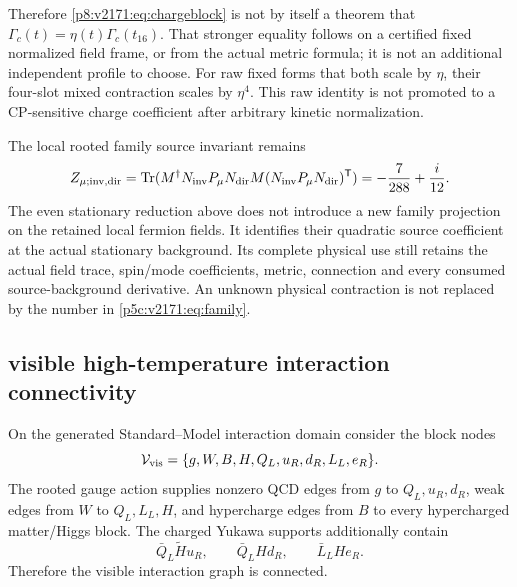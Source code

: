 \documentclass[12pt,a4paper]{article}
\begin{document}
Therefore \eqref{p8:v2171:eq:chargeblock} is not by itself a theorem that
$\Gamma_c(t)=\eta(t)\Gamma_c(t_{16})$. That stronger equality follows on
a certified fixed normalized field frame, or from the actual metric formula;
it is not an additional independent profile to choose. For raw fixed forms
that both scale by $\eta$, their four-slot mixed contraction scales by
$\eta^4$. This raw identity is not promoted to a CP-sensitive charge
coefficient after arbitrary kinetic normalization.

The local rooted family source invariant remains
\begin{equation}
 Z_{\mu;\mathrm{inv,dir}}
 =\operatorname{Tr}(M^\dagger N_{\rm inv}P_\mu N_{\rm dir}
       M(N_{\rm inv}P_\mu N_{\rm dir})^{\mathsf T})
 =-\frac7{288}+\frac{i}{12}.
 \label{p5c:v2171:eq:family}
\end{equation}
The even stationary reduction above does not introduce a new family projection
on the retained local fermion fields. It identifies their quadratic source
coefficient at the actual stationary background. Its complete physical use
still retains the actual field trace, spin/mode coefficients, metric,
connection and every consumed source-background derivative. An unknown
physical contraction is not replaced by the number in \eqref{p5c:v2171:eq:family}.

\subsection{visible high-temperature interaction connectivity}
\label{p5c:sec:v269-k16-visible-connectivity}

\begin{theorem}
\label{p5c:thm:v269-visible-interaction-graph}
On the generated Standard--Model interaction domain consider the block nodes
\[
 \mathcal V_{\rm vis}
 =\{g,W,B,H,Q_L,u_R,d_R,L_L,e_R\}.
\]
The rooted gauge action supplies nonzero QCD edges from $g$ to
$Q_L,u_R,d_R$, weak edges from $W$ to $Q_L,L_L,H$, and hypercharge edges
from $B$ to every hypercharged matter/Higgs block.  The charged Yukawa
supports additionally contain
\[
 \bar Q_L\widetilde H u_R,\qquad
 \bar Q_LH d_R,\qquad
 \bar L_LH e_R.
\]
Therefore the visible interaction graph is connected.
\end{theorem}
\end{document}
